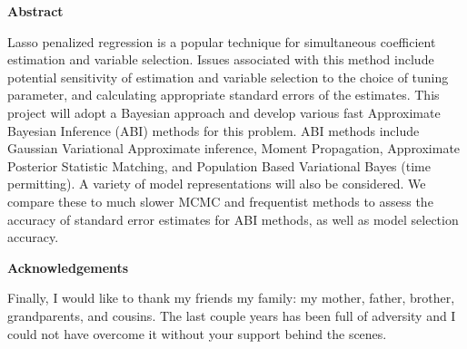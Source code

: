 \pagebreak
\hspace{0pt}

\begin{center}
    \textbf{\large Abstract }\\
    \vspace{0.5cm}
\end{center}
Lasso penalized regression is a popular technique for simultaneous coefficient estimation and variable selection. Issues associated with this method include potential sensitivity of estimation and variable selection to the choice of tuning parameter, and calculating appropriate standard errors of the estimates. This project will adopt a Bayesian approach and develop various fast Approximate Bayesian Inference (ABI) methods for this problem. ABI methods include Gaussian Variational Approximate inference, Moment Propagation, Approximate Posterior Statistic Matching, and Population Based Variational Bayes (time permitting). A variety of model representations will also be considered. We compare these to much slower MCMC and frequentist methods to assess the accuracy of standard error estimates for ABI methods, as well as model selection accuracy.


\newpage

\begin{center}
    \textbf{\large Acknowledgements}\\
    \vspace{0.5cm}
\end{center}
 
   Finally, I would like to thank my friends   my family: my mother, father, brother, grandparents, and cousins. The last couple years has been full of adversity and I could not have overcome it without your support behind the scenes.
   
\vfill
\hspace{0pt}
\pagebreak
\newpage